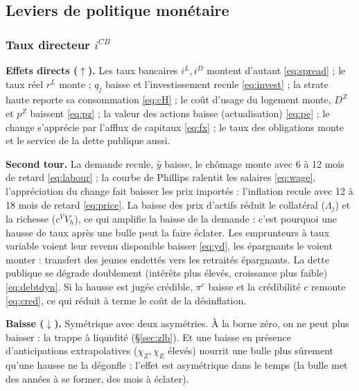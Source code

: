 \documentclass[11pt,a4paper]{article}
\newcommand{\up}{$\uparrow$}
\newcommand{\dn}{$\downarrow$}
\begin{document}
\newcommand{\impact}[1]{\subsubsection*{#1}}
\newcommand{\direct}{\par\noindent\textbf{Effets directs (\up).} }
\newcommand{\second}{\par\noindent\textbf{Second tour.} }
\newcommand{\baisse}{\par\noindent\textbf{Baisse (\dn).} }

\subsection{Leviers de politique monétaire}

\impact{Taux directeur $i^{CB}$}
\direct Les taux bancaires $i^L, i^D$ montent d'autant \eqref{eq:spread} ; le taux réel $r^L$ monte ; $q_j$ baisse et l'investissement recule \eqref{eq:invest} ; la strate haute reporte sa consommation \eqref{eq:cH} ; le coût d'usage du logement monte, $D^Z$ et $p^Z$ baissent \eqref{eq:pz} ; la valeur des actions baisse (actualisation) \eqref{eq:pe} ; le change s'apprécie par l'afflux de capitaux \eqref{eq:fx} ; le taux des obligations monte et le service de la dette publique aussi.
\second La demande recule, $\hat y$ baisse, le chômage monte avec 6 à 12 mois de retard \eqref{eq:labour} ; la courbe de Phillips ralentit les salaires \eqref{eq:wage}, l'appréciation du change fait baisser les prix importés : l'inflation recule avec 12 à 18 mois de retard \eqref{eq:price}. La baisse des prix d'actifs réduit le collatéral ($\Lambda_j$) et la richesse ($c^V V_h$), ce qui amplifie la baisse de la demande : c'est pourquoi une hausse de taux après une bulle peut la faire éclater. Les emprunteurs à taux variable voient leur revenu disponible baisser \eqref{eq:yd}, les épargnants le voient monter : transfert des jeunes endettés vers les retraités épargnants. La dette publique se dégrade doublement (intérêts plus élevés, croissance plus faible) \eqref{eq:debtdyn}. Si la hausse est jugée crédible, $\pi^e$ baisse et la crédibilité $c$ remonte \eqref{eq:cred}, ce qui réduit à terme le coût de la désinflation.
\baisse Symétrique avec deux asymétries. À la borne zéro, on ne peut plus baisser : la trappe à liquidité (\S\ref{sec:zlb}). Et une baisse en présence d'anticipations extrapolatives ($\chi_Z,\chi_E$ élevés) nourrit une bulle plus sûrement qu'une hausse ne la dégonfle : l'effet est asymétrique dans le temps (la bulle met des années à se former, des mois à éclater).
\end{document}
